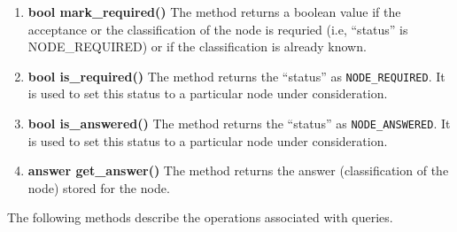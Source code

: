 \begin{enumerate}
\item \textbf{bool mark\_required()} \hfill \vskip 1pt
	The method returns a boolean value \true if the acceptance or the classification of the node is requried (i.e, ``status'' is NODE\_REQUIRED) or \false if the classification is already known.
	
\item \textbf{bool is\_required()} \hfill \vskip 1pt
	The method returns the ``status'' as \texttt{NODE\_REQUIRED}. It is used to set this status to a particular node under consideration.

\item \textbf{bool is\_answered()} \hfill \vskip 1pt
	The method returns the ``status'' as \texttt{NODE\_ANSWERED}. It is used to set this status to a particular node under consideration.
	
\item \textbf{answer get\_answer()} \hfill \vskip 1pt
	The method returns the answer (classification of the node) stored for the node. 
	
\end{enumerate}

\vskip 1pt
  The following methods describe the operations associated with queries.


